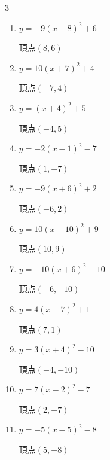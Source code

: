 \begin{multicols}{3}
\begin{enumerate}
        $\displaystyle 頂点\left( 3 , 9 \right)$

  \item $\displaystyle y=-9\left( x-8\right)^{2}+6$

        $\displaystyle 頂点\left( 8 , 6 \right)$

  \item $\displaystyle y=10\left( x+7\right)^{2}+4$

        $\displaystyle 頂点\left( -7 , 4 \right)$

  \item $\displaystyle y=\left( x+4\right)^{2}+5$

        $\displaystyle 頂点\left( -4 , 5 \right)$

  \item $\displaystyle y=-2\left( x-1\right)^{2}-7$

        $\displaystyle 頂点\left( 1 , -7 \right)$

  \item $\displaystyle y=-9\left( x+6\right)^{2}+2$

        $\displaystyle 頂点\left( -6 , 2 \right)$

  \item $\displaystyle y=10\left( x-10\right)^{2}+9$

        $\displaystyle 頂点\left( 10 , 9 \right)$

  \item $\displaystyle y=-10\left( x+6\right)^{2}-10$

        $\displaystyle 頂点\left( -6 , -10 \right)$

\columnbreak %

\resetques

  \item $\displaystyle y=4\left( x-7\right)^{2}+1$

        $\displaystyle 頂点\left( 7 , 1 \right)$

  \item $\displaystyle y=3\left( x+4\right)^{2}-10$

        $\displaystyle 頂点\left( -4 , -10 \right)$

  \item $\displaystyle y=7\left( x-2\right)^{2}-7$

        $\displaystyle 頂点\left( 2 , -7 \right)$

  \item $\displaystyle y=-5\left( x-5\right)^{2}-8$

        $\displaystyle 頂点\left( 5 , -8 \right)$


\end{enumerate}
\end{multicols}

